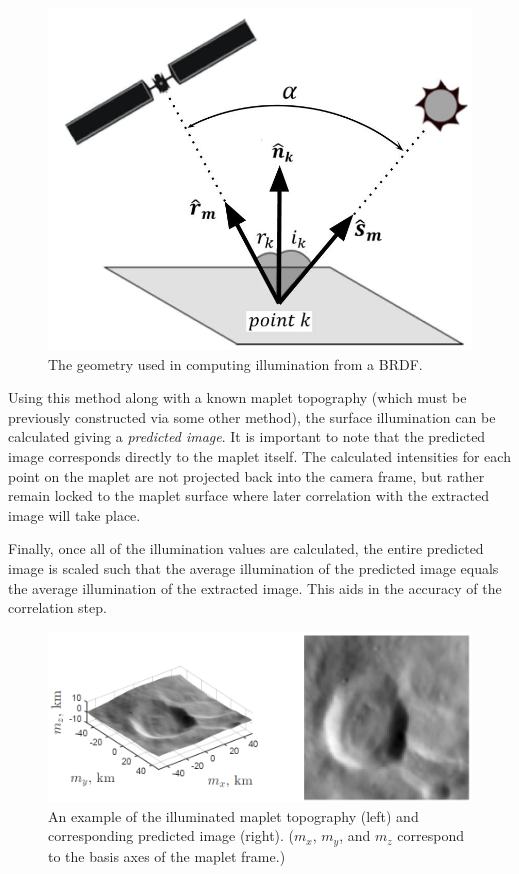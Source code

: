 \documentclass{src/RPI-SIW}
\begin{document}
\begin{figure}[h]
	\centering
	\includegraphics[width=\columnwidth]{brdf.jpg}
	\caption{The geometry used in computing illumination from a BRDF.}
	\label{figs::brdf}
\end{figure}

Using this method along with a known maplet topography (which must be previously constructed via some other method), the surface illumination can be calculated giving a \textit{predicted image}.  It is important to note that the predicted image corresponds directly to the maplet itself.  The calculated intensities for each point on the maplet are not  projected back into the camera frame, but rather remain locked to the maplet surface where later correlation with the extracted image will take place.

Finally, once all of the illumination values are calculated, the entire predicted image is scaled such that the average illumination of the predicted image equals the average illumination of the extracted image.  This aids in the accuracy of the correlation step.

\begin{figure}[h]
	\centering
	\includegraphics[width=\columnwidth]{predicted_image.png}
	\caption{An example of the illuminated maplet topography (left) and corresponding predicted image (right).  ($m_x$, $m_y$, and $m_z$ correspond to the basis axes of the maplet frame.)}
	\label{figs::predicted}
\end{figure}
\end{document}
